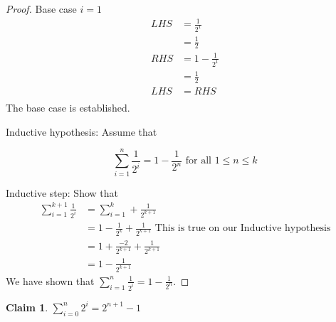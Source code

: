 \documentclass{article}
\newtheorem{claim}{Claim}
\begin{document}
    \begin{proof}

      Base case $i = 1$
      \begin{align*} 
        LHS &=  \frac{1}{2^1} \\ 
         &=  \frac{1}{2}\\
        RHS &= 1- \frac{1}{2^1}\\
        &=\frac{1}{2}\\
        LHS &= RHS\\
        \end{align*}
    The base case is established.

    Inductive hypothesis: Assume that
      
      \[ \sum\limits_{i=1}^{n} \frac{1}{2^i} = 1 - \frac{1}{2^n} \mbox{ for all $1 \leq n \leq k$}\]
     
    Inductive step: Show that
      \begin{align*} 
        \sum\limits_{i=1}^{k+1} \frac{1}{2^i} &= \sum\limits_{i=1}^{k} + \frac{1}{2^{k+1}}\\ 
         &=  1 - \frac{1}{2^k} + \frac{1}{2^{k+1}} \mbox{ This is true on our Inductive hypothesis}\\
         &= 1 + \frac{-2}{2^{k+1}} + \frac{1}{2^{k+1}}\\
         &= 1-\frac{1}{2^{k+1}}
        \end{align*}
    We have shown that $\sum\limits_{i=1}^{n} \frac{1}{2^i} = 1 - \frac{1}{2^n}$.
  
  \end{proof}


    \begin{claim}
      $\sum\limits_{i=0}^{n} 2^i = 2^{n+1} - 1$
    \end{claim}
\end{document}
